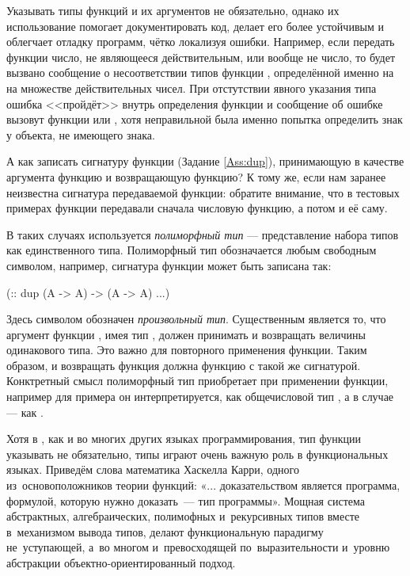 Указывать типы функций и их аргументов не обязательно, однако их использование помогает документировать код, делает его более устойчивым и облегчает отладку программ, чётко локализуя ошибки. Например, если передать функции  число, не являющееся действительным, или вообще не число, то будет вызвано сообщение о несоответствии типов функции , определённой именно на на множестве действительных чисел. При отстутствии явного указания типа ошибка <<пройдёт>> внутрь определения функции и сообщение об ошибке вызовут функции  или , хотя неправильной была именно попытка определить знак у объекта, не имеющего знака.

А как записать сигнатуру функции  (Задание \ref{Ass:dup}), принимающую в качестве аргумента функцию и возвращающую функцию? К тому же, если нам заранее неизвестна сигнатура передаваемой функции: обратите внимание, что в тестовых примерах функции  передавали сначала числовую функцию, а потом и её саму. 

В таких случаях используется  \emph{полиморфный тип} --- представление набора типов как единственного типа. Полиморфный тип обозначается любым свободным символом, например, сигнатура функции  может быть записана так:

\begin{SchemeCode}
 (:: dup (A -> A) -> (A -> A)
   ...)
\end{SchemeCode}

Здесь символом  обозначен \emph{произвольный тип}. Существенным является то, что аргумент функции , имея тип , должен принимать и возвращать величины одинакового типа. Это важно для повторного применения функции. Таким образом, и возвращать функция  должна функцию с такой же сигнатурой. Конктретный смысл полиморфный тип  приобретает при применении функции, например для примера  он интерпретируется, как общечисловой тип , а в случае  --- как .

Хотя в , как и во многих других языках программирования, тип функции указывать не обязательно, типы играют очень важную роль в функциональных языках. Приведём слова математика Хаскелла Карри, одного из~основоположников теории функций: «... доказательством является программа, формулой, которую нужно доказать~--- тип программы». Мощная система абстрактных, алгебраических, полимофных и~рекурсивных типов вместе в~механизмом вывода типов, делают функциональную парадигму не~уступающей, а~во многом и~превосходящей по~выразительности и~уровню абстракции объектно-ориентированный подход.

